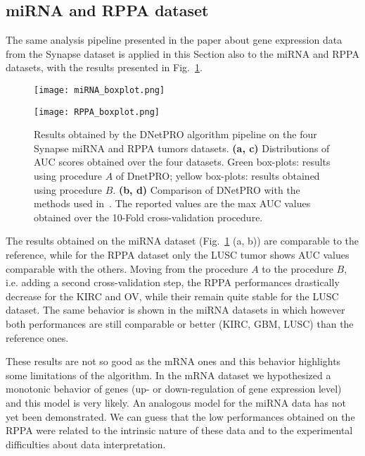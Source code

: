\documentclass{standalone}
\begin{document}
\subsection[miRNA and RPPA data]{miRNA and RPPA dataset}\label{synapse:miRNA}

The same analysis pipeline presented in the paper about gene expression data from the Synapse dataset is applied in this Section also to the miRNA and RPPA datasets, with the results presented in Fig.~\ref{fig:other_results}.

\begin{figure}[htbp]
\centering
\texttt{[image: miRNA\_boxplot.png]}
\qquad\qquad
\def\svgwidth{0.45\textwidth}

\newline
\texttt{[image: RPPA\_boxplot.png]}
\qquad\qquad
\centering
\def\svgwidth{0.45\textwidth}

\caption{Results obtained by the DNetPRO algorithm pipeline on the four Synapse miRNA and RPPA tumors datasets.
\textbf{(a, c)} Distributions of AUC scores obtained over the four datasets.
Green box-plots: results using procedure $A$ of DnetPRO; yellow box-plots: results obtained using procedure $B$.
\textbf{(b, d)} Comparison of DNetPRO with the methods used in~\cite{Yuan2014}.
The reported values are the max AUC values obtained over the 10-Fold cross-validation procedure.
}
\label{fig:other_results}
\end{figure}

The results obtained on the miRNA dataset (Fig.~\ref{fig:other_results} (a, b)) are comparable to the reference, while for the RPPA dataset only the LUSC tumor shows AUC values comparable with the others.
Moving from the procedure $A$ to the procedure $B$, i.e. adding a second cross-validation step, the RPPA performances drastically decrease for the KIRC and OV, while their remain quite stable for the LUSC dataset.
The same behavior is shown in the miRNA datasets in which however both performances are still comparable or better (KIRC, GBM, LUSC) than the reference ones.

These results are not so good as the mRNA ones and this behavior highlights some limitations of the algorithm.
In the mRNA dataset we hypothesized a monotonic behavior of genes (up- or down-regulation of gene expression level) and this model is very likely.
An analogous model for the miRNA data has not yet been demonstrated.
We can guess that the low performances obtained on the RPPA were related to the intrinsic nature of these data and to the experimental difficulties about data interpretation.
\end{document}
